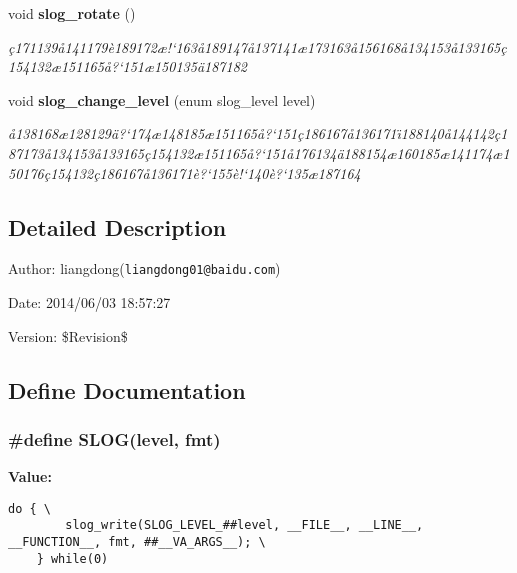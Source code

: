 \begin{CompactItemize}
void {\bf slog\_\-rotate} ()
\begin{CompactList}\small\item\em \c{c}171139\aa{}141179\`{e}189172\ae{}!`163\aa{}189147\aa{}137141\ae{}173163\aa{}156168\aa{}134153\aa{}133165\c{c}154132\ae{}151165\aa{}?`151\ae{}150135\"{a}187182 \item\end{CompactList}\item 
void {\bf slog\_\-change\_\-level} (enum slog\_\-level level)
\begin{CompactList}\small\item\em \aa{}138168\ae{}128129\"{a}?`174\ae{}148185\ae{}151165\aa{}?`151\c{c}186167\aa{}136171\"{\i}188140\aa{}144142\c{c}187173\aa{}134153\aa{}133165\c{c}154132\ae{}151165\aa{}?`151\aa{}176134\"{a}188154\ae{}160185\ae{}141174\ae{}150176\c{c}154132\c{c}186167\aa{}136171\`{e}?`155\`{e}!`140\`{e}?`135\ae{}187164 \item\end{CompactList}\end{CompactItemize}


\subsection{Detailed Description}
\begin{Desc}
\item[Author:]liangdong({\tt liangdong01@baidu.com}) \end{Desc}
\begin{Desc}
\item[Date:]2014/06/03 18:57:27 \end{Desc}
\begin{Desc}
\item[Version:]\$Revision\$ \end{Desc}


\subsection{Define Documentation}
\subsubsection{\setlength{\rightskip}{0pt plus 5cm}\#define SLOG(level, fmt)}\label{slog_8h_a0}


{\bf Value:}

\footnotesize\begin{verbatim}do { \
        slog_write(SLOG_LEVEL_##level, __FILE__, __LINE__, __FUNCTION__, fmt, ##__VA_ARGS__); \
    } while(0)
\end{verbatim}\normalsize 


